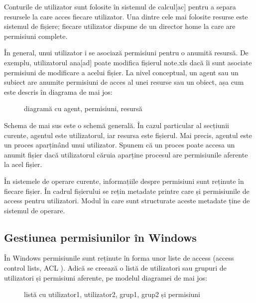 Conturile de utilizator sunt folosite în sistemul de calcul[ac] pentru a separa
resursele la care acces fiecare utilizator. Una dintre cele mai folosite resurse
este sistemul de fișiere; fiecare utilizator dispune de un director home la care
are permisiuni complete.

În general, unui utilizator i se asociază permisiuni pentru o anumită resursă.
De exemplu, utilizatorul ana[ad] poate modifica fișierul note.xls dacă îi sunt
asociate permisiuni de modificare a acelui fișier. La nivel conceptual, un agent
sau un subiect are anumite permisiuni de acces al unei resurse sau un obiect,
așa cum este descris în diagrama de mai jos:

\begin{figure}[htbp]
	\centering
	\def\svgwidth{\columnwidth}
	
	\caption{diagramă cu agent, permisiuni, resursă}
	\label{fig:user-agent-perm}
\end{figure}

Schema de mai sus este o schemă generală. În cazul particular al secțiunii
curente, agentul este utilizatorul, iar resursa este fișierul. Mai precis,
agentul este un proces aparținând unui utilizator. Spunem că un proces poate
accesa un anumit fișier dacă utilizatorul căruia aparține procesul are
permisiunile aferente la acel fișier.

În sistemele de operare curente, informațiile despre permisiuni sunt reținute în
fiecare fișier. În cadrul fișierului se rețin metadate printre care și
permisiunile de access pentru utilizatori. Modul în care sunt structurate aceste
metadate ține de sistemul de operare.

\subsection{Gestiunea permisiunilor în Windows}
\label{sec:users-fs-perms-windows}


În Windows permisiunile sunt reținute în forma unor liste de access (access
control lists, ACL ). Adică se creează o listă
de utilizatori sau grupuri de utilizatori și permisiuni aferente, pe modelul
diagramei de mai jos:

\begin{figure}[htbp]
	\centering
	\def\svgwidth{\columnwidth}
	
	\caption{listă cu utilizator1, utilizator2, grup1, grup2 și permisiuni}
	\label{fig:user-acl}
\end{figure}


